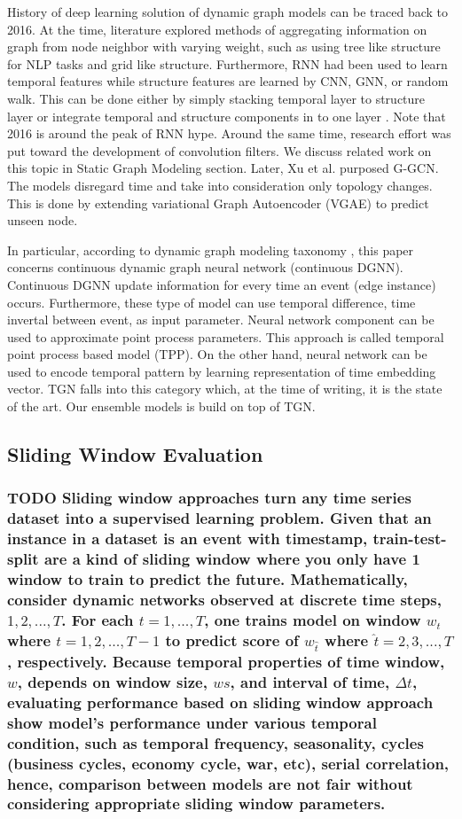\documentclass{IEEEtran}
\begin{document}
History of deep learning solution of dynamic graph models can be traced back to 2016. At the time, literature explored methods of aggregating information on graph from node neighbor with varying weight, such as using tree like structure for NLP tasks and grid like structure. Furthermore, RNN had been used to learn temporal features while structure features are learned by CNN, GNN, or random walk. This can be done either by simply stacking temporal layer to structure layer or integrate temporal and structure components in to one layer \cite{seo2018structured}. Note that 2016 is around the peak of RNN hype. Around the same time, research effort was put toward the development of convolution filters. We discuss related work on this topic in Static Graph Modeling section. Later, Xu et al. \cite{xu2019generative} purposed G-GCN. The models disregard time and take into consideration only topology changes. This is done by extending variational Graph Autoencoder (VGAE) \cite{kipf2016variational} to predict unseen node.

In particular, according to dynamic graph modeling taxonomy \cite{kazemiRepresentationLearningDynamica}, this paper concerns continuous dynamic graph neural network (continuous DGNN). Continuous DGNN update information for every time an event (edge instance) occurs. Furthermore, these type of model can use temporal difference, time invertal between event, as input parameter. Neural network component can be used to approximate point process parameters. This approach is called temporal point process based model (TPP). On the other hand, neural network can be used to encode temporal pattern by learning representation of time embedding vector. TGN falls into this category which, at the time of writing, it is the state of the art. Our ensemble models is build on top of TGN.
\subsection{Sliding Window Evaluation}
\label{sec:orge373f7f}
\subsubsection{{\bfseries\sffamily TODO} Sliding window approaches turn any time series dataset into a supervised learning problem. Given that an instance in a dataset is an event with timestamp, train-test-split are a kind of sliding window where you only have 1 window to train to predict the future. Mathematically, consider dynamic networks observed at discrete time steps, \(1,2,...,T\). For each \(t = 1,...,T\), one trains model on window \(w_{t}\) where \(t=1,2,...,T-1\) to predict score of \(w_{\hat t}\) where \(\hat t=2,3,...,T\), respectively. Because temporal properties of time window, \(w\), depends on window size, \(ws\), and interval of time, \(\Delta t\), evaluating performance based on sliding window approach show model's performance under various temporal condition, such as temporal frequency, seasonality, cycles (business cycles, economy cycle, war, etc), serial correlation, hence, comparison between models are not fair without considering appropriate sliding window parameters.}
\label{sec:org81c349e}
\end{document}
